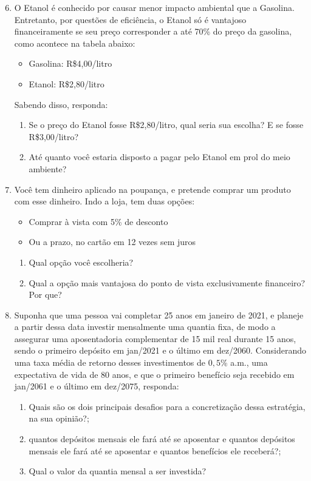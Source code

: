 \begin{enumerate}\setcounter{enumi}{5}
\item O Etanol é conhecido por causar menor impacto ambiental que a Gasolina. Entretanto, por questões de eficiência, o Etanol só é vantajoso financeiramente se seu preço corresponder a até 70\% do preço da gasolina, como acontece na tabela abaixo:
  \begin{itemize}

  \item Gasolina: R\$4,00/litro 
  \item Etanol: R\$2,80/litro 

  \end{itemize}
Sabendo disso, responda:
  \begin{enumerate}
     \item Se o preço do Etanol fosse R\$2,80/litro, qual seria sua escolha? E se fosse R\$3,00/litro?
     \item Até quanto você estaria disposto a pagar pelo Etanol em prol do meio ambiente?
  \end{enumerate}

\item Você tem dinheiro aplicado na poupança, e pretende comprar um produto com esse dinheiro. Indo a loja, tem duas opções:
  \begin{itemize}
  \item Comprar à vista com 5\% de desconto
  \item Ou a prazo, no cartão em 12 vezes sem juros
  \end{itemize}

  \begin{enumerate}
  \item Qual opção você escolheria?
  \item Qual a opção mais vantajosa do ponto de vista exclusivamente financeiro? Por que?
  \end{enumerate}

\item Suponha que uma pessoa vai completar 25 anos em janeiro de 2021, e planeje a partir dessa data investir mensalmente uma quantia fixa, de modo a assegurar uma aposentadoria complementar de 15 mil real durante 15 anos, sendo o primeiro depósito em jan/2021 e o último em dez/2060. Considerando uma taxa média de retorno desses investimentos de $0{,}5$\% a.m., uma expectativa de vida de 80 anos, e que o primeiro benefício seja recebido em jan/2061 e o último em dez/2075, responda:

\begin{enumerate}
  \item Quais são os dois principais desafios para a concretização dessa estratégia, na sua opinião?;
  \item quantos depósitos mensais ele fará até se aposentar e quantos depósitos mensais ele fará até se aposentar e quantos benefícios ele receberá?;
  \item Qual o valor da quantia mensal a ser investida?
\end{enumerate}


\end{enumerate}
